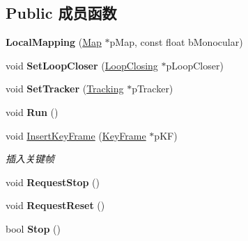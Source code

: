 \subsection*{Public 成员函数}
\begin{DoxyCompactItemize}
\item 
\hypertarget{classORB__SLAM2_1_1LocalMapping_aa87b27706cc45e36cbb8c7a21c90ed23}{{\bfseries Local\-Mapping} (\hyperlink{classORB__SLAM2_1_1Map}{Map} $\ast$p\-Map, const float b\-Monocular)}\label{classORB__SLAM2_1_1LocalMapping_aa87b27706cc45e36cbb8c7a21c90ed23}

\item 
\hypertarget{classORB__SLAM2_1_1LocalMapping_af64985dda85b4f0775ef2ef7fc9b5942}{void {\bfseries Set\-Loop\-Closer} (\hyperlink{classORB__SLAM2_1_1LoopClosing}{Loop\-Closing} $\ast$p\-Loop\-Closer)}\label{classORB__SLAM2_1_1LocalMapping_af64985dda85b4f0775ef2ef7fc9b5942}

\item 
\hypertarget{classORB__SLAM2_1_1LocalMapping_a164b3d0a2a75daba006469ea8aca8a63}{void {\bfseries Set\-Tracker} (\hyperlink{classORB__SLAM2_1_1Tracking}{Tracking} $\ast$p\-Tracker)}\label{classORB__SLAM2_1_1LocalMapping_a164b3d0a2a75daba006469ea8aca8a63}

\item 
\hypertarget{classORB__SLAM2_1_1LocalMapping_a0f9fa8a0236f55629b0f485db05deb2c}{void {\bfseries Run} ()}\label{classORB__SLAM2_1_1LocalMapping_a0f9fa8a0236f55629b0f485db05deb2c}

\item 
void \hyperlink{classORB__SLAM2_1_1LocalMapping_af2d70466a1a217fb7e55d874931ce688}{Insert\-Key\-Frame} (\hyperlink{classORB__SLAM2_1_1KeyFrame}{Key\-Frame} $\ast$p\-K\-F)
\begin{DoxyCompactList}\small\item\em 插入关键帧 \end{DoxyCompactList}\item 
\hypertarget{classORB__SLAM2_1_1LocalMapping_a0931d72a1f25f3e012f53f3e693e2a47}{void {\bfseries Request\-Stop} ()}\label{classORB__SLAM2_1_1LocalMapping_a0931d72a1f25f3e012f53f3e693e2a47}

\item 
\hypertarget{classORB__SLAM2_1_1LocalMapping_a1e2754881977ca4d9dc7b3d0c06b4eb8}{void {\bfseries Request\-Reset} ()}\label{classORB__SLAM2_1_1LocalMapping_a1e2754881977ca4d9dc7b3d0c06b4eb8}

\item 
\hypertarget{classORB__SLAM2_1_1LocalMapping_a6acf915f6b65bd4e2341e85a320d4930}{bool {\bfseries Stop} ()}\label{classORB__SLAM2_1_1LocalMapping_a6acf915f6b65bd4e2341e85a320d4930}


\end{DoxyCompactItemize}
